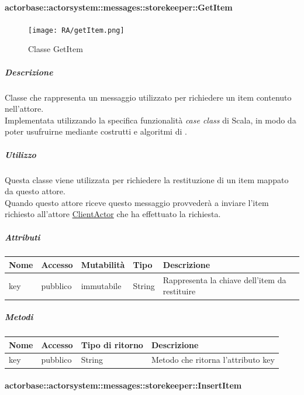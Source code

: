 \documentclass{scalatekids-article}
\begin{document}
\paragraph{actorbase::actorsystem::messages::storekeeper::GetItem}
\label{sec:actorbase::actorsystem::messages::storekeeper::GetItem}

\begin{figure}[H]
  \begin{center}
    \texttt{[image: RA/getItem.png]}
    \caption{Classe GetItem}
  \end{center}
\end{figure}

\subparagraph{Descrizione}
Classe che rappresenta un messaggio utilizzato per richiedere un item
contenuto nell'attore.\\Implementata utilizzando la specifica funzionalità \textit{case class} di Scala,
in modo da poter usufruirne mediante costrutti e algoritmi di
.

\subparagraph{Utilizzo}
Questa classe viene utilizzata per richiedere la restituzione di un
item mappato da questo attore.\\Quando questo attore riceve questo
messaggio provvederà a inviare l'item richiesto all'attore \hyperref[sec:actorbase::actorsystem::actors::clientactor::ClientActor]{ClientActor} che
ha effettuato la richiesta.

\subparagraph{Attributi}
\begin{tabular}{| p{2cm} | p{1.5cm} | p{2cm} | p{3cm} | p{8.5cm} |}
  \hline
  Nome & Accesso & Mutabilità & Tipo & Descrizione\\
  \hline
  key & pubblico & immutabile & String & Rappresenta la chiave dell'item da restituire\\
  \hline
\end{tabular}

\subparagraph{Metodi}
\begin{tabular}{| l | l | l | l |}
  \hline
  Nome & Accesso & Tipo di ritorno & Descrizione\\
  \hline
  key & pubblico & String & Metodo che ritorna l'attributo key\\
  \hline
\end{tabular}

\paragraph{actorbase::actorsystem::messages::storekeeper::InsertItem}
\label{sec:actorbase::actorsystem::messages::storekeeper::InsertItem}
\end{document}

